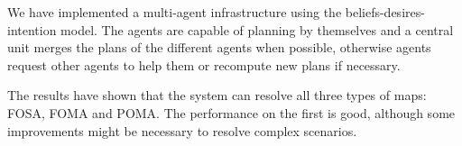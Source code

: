 We have implemented a multi-agent infrastructure using the beliefs-desires-intention model. The agents are
capable of planning by themselves and a central unit merges the plans of the different agents when possible,
otherwise agents request other agents to help them or recompute new plans if necessary.

The results have shown that the system can resolve all three types of maps: FOSA, FOMA and POMA. The
performance on the first is good, although some improvements might be necessary to resolve complex scenarios.